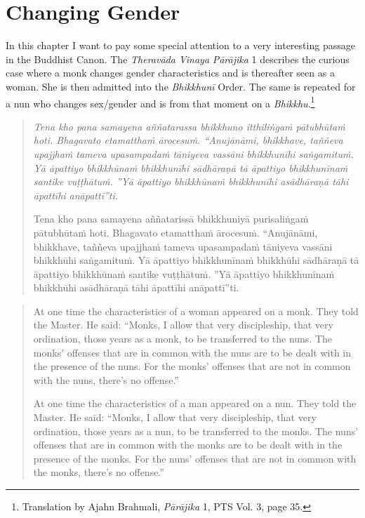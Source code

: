 \section{Changing Gender}
\label{trans}

In this chapter I want to pay some special attention to a very interesting passage in the Buddhist Canon. The {\em Theravāda Vinaya} {\em Pā­rāji­ka} 1 describes the curious case where a monk changes gender characteristics and is thereafter seen as a woman. She is then admitted into the {\em Bhikkhunī} Order. The same is repeated for a nun who changes sex/gender and is from that moment on a {\em Bhikkhu}.\footnote{Translation by Ajahn Brahmali, {\em Pā­rāji­ka} 1, PTS Vol. 3, page 35.} 

\begin{quote}
{\em Tena kho pana samayena aññatarassa bhikkhuno itthiliṅgaṁ pātubhūtaṁ hoti. Bhagavato etamatthaṁ ārocesuṁ. “Anujānāmi, bhikkhave, taññeva upajjhaṁ tameva upasampadaṁ tāniyeva vassāni bhikkhunīhi saṅgamituṁ. Yā āpattiyo bhikkhūnaṁ bhikkhunīhi sādhāraṇā tā āpattiyo bhikkhunīnaṁ santike vuṭṭhātuṁ. ”Yā āpattiyo bhikkhūnaṁ bhikkhunīhi asādhāraṇā tāhi āpattīhi anāpattī”ti.

Tena kho pana samayena aññatarissā bhikkhuniyā purisaliṅgaṁ pātubhūtaṁ hoti. Bhagavato etamatthaṁ ārocesuṁ. “Anujānāmi, bhikkhave, taññeva upajjhaṁ tameva upasampadaṁ tāniyeva vassāni bhikkhūhi saṅgamituṁ. Yā āpattiyo bhikkhunīnaṁ bhikkhūhi sādhāraṇā tā āpattiyo bhikkhūnaṁ santike vuṭṭhātuṁ. ”Yā āpattiyo bhikkhunīnaṁ bhikkhūhi asādhāraṇā tāhi āpattīhi anāpattī”ti.}
\end{quote}

\begin{quote}
At one time the characteristics of a woman appeared on a monk. They told the Master. He said: “Monks, I allow that very discipleship, that very ordination, those years as a monk, to be transferred to the nuns. The monks’ offenses that are in common with the nuns are to be dealt with in the presence of the nuns. For the monks’ offenses that are not in common with the nuns, there’s no offense.”

At one time the characteristics of a man appeared on a nun. They told the Master. He said: “Monks, I allow that very discipleship, that very ordination, those years as a nun, to be transferred to the monks. The nuns’ offenses that are in common with the monks are to be dealt with in the presence of the monks. For the nuns’ offenses that are not in common with the monks, there’s no offense.”
\end{quote}

